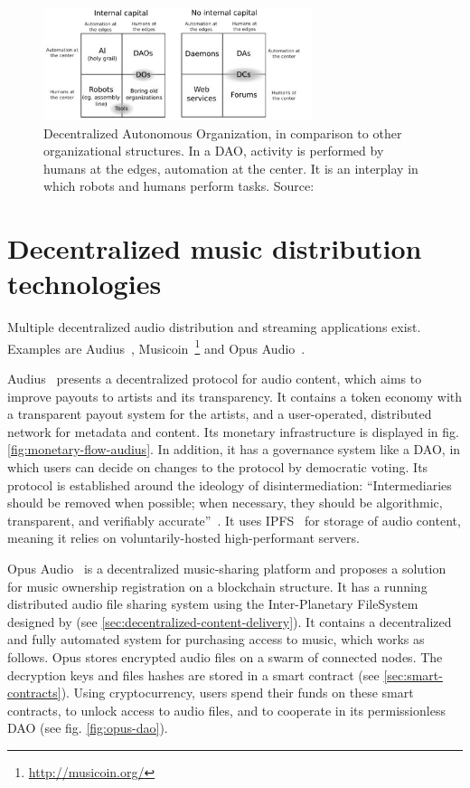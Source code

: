 
\begin{figure}
    \centering
    \includegraphics[width=0.7\textwidth]{introduction/dao-quadrants.jpg}
    \caption{Decentralized Autonomous Organization, in comparison to other organizational structures. In a DAO, activity is performed by humans at the edges, automation at the center. It is an interplay in which robots and humans perform tasks. Source: \cite{buterin2014dao}}
    \label{fig:dao-quadrants}
\end{figure}

\section{Decentralized music distribution technologies}
Multiple decentralized audio distribution and streaming applications exist. Examples are Audius~\citep{audius2018}, Musicoin~\footnote{\url{http://musicoin.org/}} and Opus Audio~\citep{jia2016opus}.

Audius~\citep{audius2018} presents a decentralized protocol for audio content, which aims to improve payouts to artists and its transparency. It contains a token economy with a transparent payout system for the artists, and a user-operated, distributed network for metadata and content. Its monetary infrastructure is displayed in fig. \ref{fig:monetary-flow-audius}. In addition, it has a governance system like a DAO, in which users can decide on changes to the protocol by democratic voting. Its protocol is established around the ideology of disintermediation: ``Intermediaries  should be removed  when possible; when necessary, they should be algorithmic, transparent, and verifiably accurate''~\citep{audius2018}. It uses IPFS~\citep{benet2014ipfs} for storage of audio content, meaning it relies on voluntarily-hosted high-performant servers.

Opus Audio~\citep{jia2016opus} is a decentralized music-sharing platform and proposes a solution for music ownership registration on a blockchain structure. It has a running distributed audio file sharing system using the Inter-Planetary FileSystem designed by \cite{benet2014ipfs} (see \ref{sec:decentralized-content-delivery}). It contains a decentralized and fully automated system for purchasing access to music, which works as follows. Opus stores encrypted audio files on a swarm of connected nodes. The decryption keys and files hashes are stored in a smart contract (see \ref{sec:smart-contracts}). Using cryptocurrency, users spend their funds on these smart contracts, to unlock access to audio files, and to cooperate in its permissionless DAO (see fig. \ref{fig:opus-dao}).

